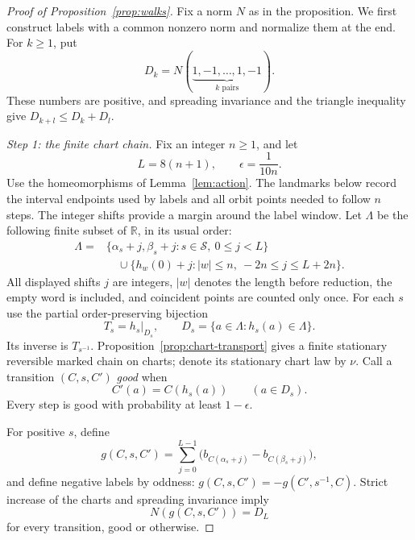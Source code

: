 \documentclass[11pt]{article}
\theoremstyle{definition}
\theoremstyle{remark}
\newcommand{\R}{\mathbb R}
\newcommand{\cS}{\mathcal S}
\begin{document}
\begin{proof}[Proof of Proposition~\ref{prop:walks}]
Fix a norm $N$ as in the proposition. We first construct labels with a
common nonzero norm and normalize them at the end.
For $k\geq1$, put
\[
 D_k=N(\underbrace{1,-1,\ldots,1,-1}_{k\text{ pairs}}).
\]
These numbers are positive, and spreading invariance and the triangle
inequality give $D_{k+l}\leq D_k+D_l$.

\par\smallskip
{}
\noindent\emph{Step 1: the finite chart chain.}
Fix an integer $n\geq1$, and let
\[
 L=8(n+1),\qquad \epsilon=\frac1{10n}.
\]
Use the homeomorphisms of Lemma~\ref{lem:action}.
The landmarks below record the interval endpoints used by labels and
all orbit points needed to follow $n$ steps. The integer shifts provide
a margin around the label window. Let $\Lambda$ be the following finite
subset of $\R$, in its usual order:
\begin{equation}\label{eq:landmarks}
 \begin{split}
 \Lambda={}&\{\alpha_s+j,\beta_s+j:s\in\cS,\ 0\leq j<L\}\\
 &\quad\cup
 \{h_w(0)+j: |w|\leq n,\ -2n\leq j\leq L+2n\}.
 \end{split}
\end{equation}
All displayed shifts $j$ are integers, $|w|$ denotes the length before
reduction, the empty word is included, and coincident points are counted
only once.
For each $s$ use the partial order-preserving bijection
\[
 T_s=h_s|_{D_s},\qquad
 D_s=\{a\in\Lambda:h_s(a)\in\Lambda\}.
\]
Its inverse is $T_{s^{-1}}$.
Proposition~\ref{prop:chart-transport} gives a finite stationary
reversible marked chain on charts; denote its stationary chart law by
$\nu$.
Call a transition $(C,s,C')$ \emph{good} when
\begin{equation}\label{eq:good}
 C'(a)=C(h_s(a))\qquad(a\in D_s).
\end{equation}
Every step is good with probability at least $1-\epsilon$.

For positive $s$, define
\begin{equation}\label{eq:labels}
 g(C,s,C')=\sum_{j=0}^{L-1}
     \bigl(b_{C(\alpha_s+j)}-b_{C(\beta_s+j)}\bigr),
\end{equation}
and define negative labels by oddness:
$g(C,s,C')=-g(C',s^{-1},C)$.
Strict increase of the charts and spreading invariance imply
\begin{equation}\label{eq:one-step-norm}
 N(g(C,s,C'))=D_L
\end{equation}
for every transition, good or otherwise.


\end{proof}
\end{document}
